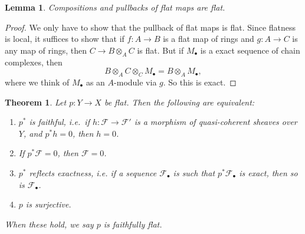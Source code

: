 \documentclass{shortart}
\newtheorem*{thm}{Theorem}
\newtheorem*{lemma}{Lemma}
\theoremstyle{definition}
\newcommand*{\Cdot}{\bullet}
\newcommand*{\Cdot}{{\raisebox{-0.25ex}{\scalebox{1.5}{$\cdot$}}}}
\begin{document}
\begin{lemma}
  Compositions and pullbacks of flat maps are flat.
\end{lemma}
\begin{proof}
  We only have to show that the pullback of flat maps is flat. Since flatness is local, it suffices to show that if $f: A \to B$ is a flat map of rings and $g:A \to C$ is any map of rings, then $C \to B \otimes_A C$ is flat. But if $M_\Cdot$ is a exact sequence of chain complexes, then
  \[
    B \otimes_A C \otimes_C M_\Cdot = B \otimes_A M_\Cdot,
  \]
  where we think of $M_\Cdot$ as an $A$-module via $g$. So this is exact.
\end{proof}

\begin{thm}
  Let $p: Y \to X$ be flat. Then the following are equivalent:
  \begin{enumerate}
    \item $p^*$ is faithful, i.e.\ if $h: \mathcal{F} \to \mathcal{F}'$ is a morphism of quasi-coherent sheaves over $Y$, and $p^*h = 0$, then $h = 0$.
    \item If $p^* \mathcal{F} = 0$, then $\mathcal{F} = 0$.
    \item $p^*$ reflects exactness, i.e. if a sequence $\mathcal{F}_\Cdot$ is such that $p^* \mathcal{F}_\Cdot$ is exact, then so is $\mathcal{F}_\Cdot$.
    \item $p$ is surjective.
  \end{enumerate}
  When these hold, we say $p$ is \emph{faithfully flat}.
\end{thm}
\end{document}
